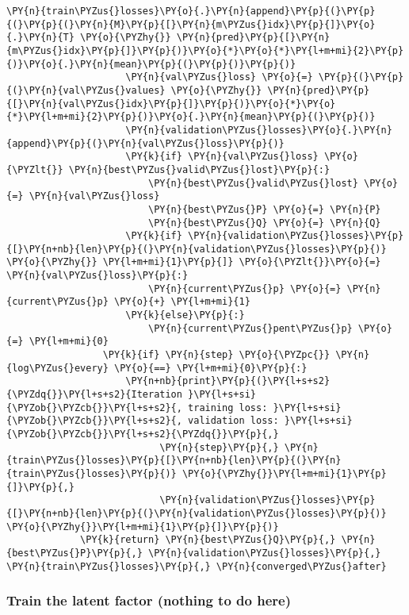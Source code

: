\begin{Verbatim}[commandchars=\\\{\}]
                     \PY{n}{train\PYZus{}losses}\PY{o}{.}\PY{n}{append}\PY{p}{(}\PY{p}{(}\PY{p}{(}\PY{n}{M}\PY{p}{[}\PY{n}{m\PYZus{}idx}\PY{p}{]}\PY{o}{.}\PY{n}{T} \PY{o}{\PYZhy{}} \PY{n}{pred}\PY{p}{[}\PY{n}{m\PYZus{}idx}\PY{p}{]}\PY{p}{)}\PY{o}{*}\PY{o}{*}\PY{l+m+mi}{2}\PY{p}{)}\PY{o}{.}\PY{n}{mean}\PY{p}{(}\PY{p}{)}\PY{p}{)}
                     \PY{n}{val\PYZus{}loss} \PY{o}{=} \PY{p}{(}\PY{p}{(}\PY{n}{val\PYZus{}values} \PY{o}{\PYZhy{}} \PY{n}{pred}\PY{p}{[}\PY{n}{val\PYZus{}idx}\PY{p}{]}\PY{p}{)}\PY{o}{*}\PY{o}{*}\PY{l+m+mi}{2}\PY{p}{)}\PY{o}{.}\PY{n}{mean}\PY{p}{(}\PY{p}{)}
                     \PY{n}{validation\PYZus{}losses}\PY{o}{.}\PY{n}{append}\PY{p}{(}\PY{n}{val\PYZus{}loss}\PY{p}{)}
                     \PY{k}{if} \PY{n}{val\PYZus{}loss} \PY{o}{\PYZlt{}} \PY{n}{best\PYZus{}valid\PYZus{}lost}\PY{p}{:}
                         \PY{n}{best\PYZus{}valid\PYZus{}lost} \PY{o}{=} \PY{n}{val\PYZus{}loss}
                         \PY{n}{best\PYZus{}P} \PY{o}{=} \PY{n}{P}
                         \PY{n}{best\PYZus{}Q} \PY{o}{=} \PY{n}{Q}
                     \PY{k}{if} \PY{n}{validation\PYZus{}losses}\PY{p}{[}\PY{n+nb}{len}\PY{p}{(}\PY{n}{validation\PYZus{}losses}\PY{p}{)} \PY{o}{\PYZhy{}} \PY{l+m+mi}{1}\PY{p}{]} \PY{o}{\PYZlt{}}\PY{o}{=} \PY{n}{val\PYZus{}loss}\PY{p}{:}
                         \PY{n}{current\PYZus{}p} \PY{o}{=} \PY{n}{current\PYZus{}p} \PY{o}{+} \PY{l+m+mi}{1}
                     \PY{k}{else}\PY{p}{:}
                         \PY{n}{current\PYZus{}pent\PYZus{}p} \PY{o}{=} \PY{l+m+mi}{0}
                 \PY{k}{if} \PY{n}{step} \PY{o}{\PYZpc{}} \PY{n}{log\PYZus{}every} \PY{o}{==} \PY{l+m+mi}{0}\PY{p}{:}
                     \PY{n+nb}{print}\PY{p}{(}\PY{l+s+s2}{\PYZdq{}}\PY{l+s+s2}{Iteration }\PY{l+s+si}{\PYZob{}\PYZcb{}}\PY{l+s+s2}{, training loss: }\PY{l+s+si}{\PYZob{}\PYZcb{}}\PY{l+s+s2}{, validation loss: }\PY{l+s+si}{\PYZob{}\PYZcb{}}\PY{l+s+s2}{\PYZdq{}}\PY{p}{,} 
                           \PY{n}{step}\PY{p}{,} \PY{n}{train\PYZus{}losses}\PY{p}{[}\PY{n+nb}{len}\PY{p}{(}\PY{n}{train\PYZus{}losses}\PY{p}{)} \PY{o}{\PYZhy{}}\PY{l+m+mi}{1}\PY{p}{]}\PY{p}{,}
                           \PY{n}{validation\PYZus{}losses}\PY{p}{[}\PY{n+nb}{len}\PY{p}{(}\PY{n}{validation\PYZus{}losses}\PY{p}{)} \PY{o}{\PYZhy{}}\PY{l+m+mi}{1}\PY{p}{]}\PY{p}{)}
             \PY{k}{return} \PY{n}{best\PYZus{}Q}\PY{p}{,} \PY{n}{best\PYZus{}P}\PY{p}{,} \PY{n}{validation\PYZus{}losses}\PY{p}{,} \PY{n}{train\PYZus{}losses}\PY{p}{,} \PY{n}{converged\PYZus{}after}
\end{Verbatim}

    \hypertarget{train-the-latent-factor-nothing-to-do-here}{%
\subsubsection{Train the latent factor (nothing to do
here)}\label{train-the-latent-factor-nothing-to-do-here}}

